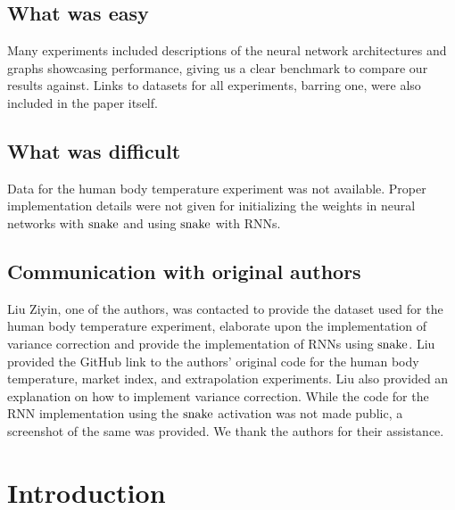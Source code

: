 \subsection*{What was easy}

Many experiments included descriptions of the neural network architectures and graphs showcasing performance, giving us a clear benchmark to compare our results against. Links to datasets for all experiments, barring one, were also included in the paper itself.

\subsection*{What was difficult}

Data for the human body temperature experiment was not available. Proper implementation details were not given for initializing the weights in neural networks with \( \operatorname{snake} \) and using \( \operatorname{snake} \) with RNNs.

\subsection*{Communication with original authors}

Liu Ziyin, one of the authors, was contacted to provide the dataset used for the human body temperature experiment, elaborate upon the implementation of variance correction and provide the implementation of RNNs using $ \operatorname{snake} $. Liu provided the GitHub link to the authors' original code for the human body temperature, market index, and extrapolation experiments. Liu also provided an explanation on how to implement variance correction. While the code for the RNN implementation using the \(  \operatorname{snake} \) activation was not made public, a screenshot of the same was provided. We thank the authors for their assistance.

\section{Introduction}

